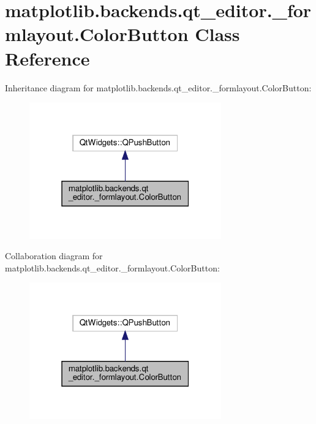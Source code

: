\hypertarget{classmatplotlib_1_1backends_1_1qt__editor_1_1__formlayout_1_1ColorButton}{}\section{matplotlib.\+backends.\+qt\+\_\+editor.\+\_\+formlayout.\+Color\+Button Class Reference}
\label{classmatplotlib_1_1backends_1_1qt__editor_1_1__formlayout_1_1ColorButton}


Inheritance diagram for matplotlib.\+backends.\+qt\+\_\+editor.\+\_\+formlayout.\+Color\+Button\+:
\nopagebreak
\begin{figure}[H]
\begin{center}
\leavevmode
\includegraphics[width=235pt]{classmatplotlib_1_1backends_1_1qt__editor_1_1__formlayout_1_1ColorButton__inherit__graph}
\end{center}
\end{figure}


Collaboration diagram for matplotlib.\+backends.\+qt\+\_\+editor.\+\_\+formlayout.\+Color\+Button\+:
\nopagebreak
\begin{figure}[H]
\begin{center}
\leavevmode
\includegraphics[width=235pt]{classmatplotlib_1_1backends_1_1qt__editor_1_1__formlayout_1_1ColorButton__coll__graph}
\end{center}
\end{figure}

